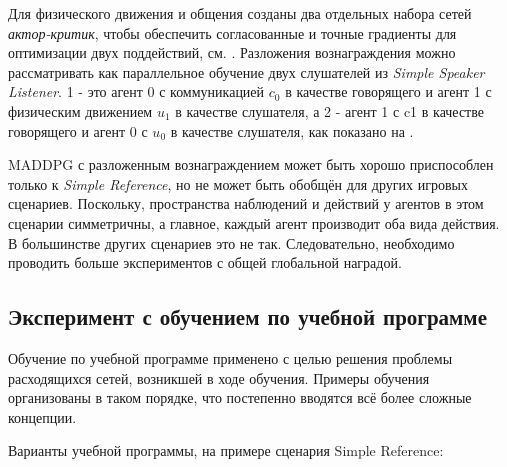 Для физического движения и общения созданы два отдельных набора сетей \textit{актор-критик}, чтобы обеспечить согласованные и точные градиенты для оптимизации двух поддействий, см. . Разложения вознаграждения можно рассматривать как параллельное обучение двух слушателей из \textit{Simple Speaker Listener}. 1 - это агент 0 с коммуникацией $c_0$ в качестве говорящего и агент 1 с физическим движением $u_1$ в качестве слушателя, а 2 - агент 1 с c1 в качестве говорящего и агент 0 с $u_0$ в качестве слушателя, как показано на .

MADDPG с разложенным вознаграждением может быть хорошо приспособлен только к \textit{Simple Reference}, но не может быть обобщён для других игровых сценариев. Поскольку, пространства наблюдений и действий у агентов в этом сценарии симметричны, а главное, каждый агент производит оба вида действия. В большинстве других сценариев это не так. Следовательно, необходимо проводить больше экспериментов с общей глобальной наградой.

\subsection{Эксперимент с обучением по учебной программе}

Обучение по учебной программе применено с целью решения проблемы расходящихся сетей, возникшей в ходе обучения. Примеры обучения организованы в таком порядке, что постепенно вводятся всё более сложные концепции.

Варианты учебной программы, на примере сценария Simple Reference:


